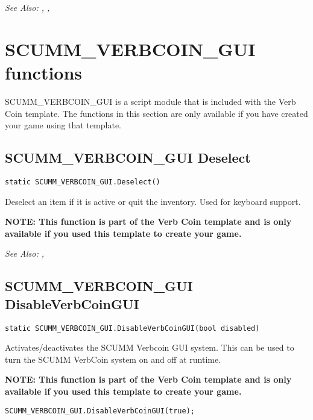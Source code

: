 \it{See Also:} ,
,



\section{SCUMM_VERBCOIN_GUI functions}

SCUMM_VERBCOIN_GUI is a script module that is included with the Verb Coin template.
The functions in this section are only available if you have created your game
using that template.




\subsection{SCUMM_VERBCOIN_GUI Deselect}\label{SCUMM_VERBCOIN_GUI.Deselect}%

\begin{verbatim}
static SCUMM_VERBCOIN_GUI.Deselect()
\end{verbatim}
Deselect an item if it is active or quit the inventory. Used for keyboard support.

\bf{NOTE:} This function is part of the Verb Coin template and is only available if
you used this template to create your game.

\it{See Also:} ,


\subsection{SCUMM_VERBCOIN_GUI DisableVerbCoinGUI}\label{SCUMM_VERBCOIN_GUI.DisableVerbCoinGUI}%

\begin{verbatim}
static SCUMM_VERBCOIN_GUI.DisableVerbCoinGUI(bool disabled)
\end{verbatim}
Activates/deactivates the SCUMM Verbcoin GUI system. This can be used to turn the SCUMM
VerbCoin system on and off at runtime.

\bf{NOTE:} This function is part of the Verb Coin template and is only available if
you used this template to create your game.

\begin{verbatim}
SCUMM_VERBCOIN_GUI.DisableVerbCoinGUI(true);
\end{verbatim}

